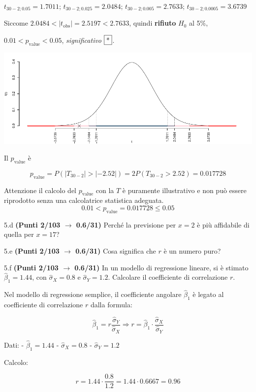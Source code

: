 \documentclass[
  11pt,
]{book}
\theoremstyle{mytheoremstyle}
\theoremstyle{mydefstyle}
\newenvironment{sol}
  {
  \begin{tcolorbox}[enhanced,breakable,arc=0.1mm,boxrule=1pt,colback=white,colframe=iblue,
  title=\bf \fontfamily{lmss}\selectfont \hspace{.5 cm} Soluzione,drop fuzzy shadow]

}{
\end{tcolorbox}
  }
\begin{document}
\begin{sol}
\(t_{30-2;0.05}=1.7011\); \(t_{30-2;0.025}=2.0484\); \(t_{30-2;0.005}=2.7633\); \(t_{30-2;0.0005}=3.6739\)

Siccome \(2.0484<|t_\text{obs}|=2.5197<2.7633\), quindi \textbf{rifiuto} \(H_0\) al 5\%,

\(0.01<p_\text{value}<0.05\), \emph{significativo} \(\fbox{*}\).

\begin{center}\includegraphics{Esami_passati_con_soluzioni_files/figure-latex/2.5c-1} \end{center}

Il \(p_{\text{value}}\) è

\[ p_{\text{value}} = P(|T_{30-2}|>|-2.52|)=2P(T_{30-2}>2.52)=0.017728 \]

Attenzione il calcolo del \(p_\text{value}\) con la \(T\) è puramente illustrativo e non può essere riprodotto senza una calcolatrice statistica adeguata.\[
 0.01 < p_\text{value}= 0.017728 \leq 0.05 
\]

\end{sol}

5.d \textbf{(Punti 2/103 \(\rightarrow\) 0.6/31)} Perché la previsione per \(x=2\) è più affidabile di quella per \(x=17\)?

5.e \textbf{(Punti 2/103 \(\rightarrow\) 0.6/31)} Cosa significa che \(r\) è un numero puro?

5.f \textbf{(Punti 2/103 \(\rightarrow\) 0.6/31)} In un modello di regressione lineare, si è stimato \(\hat\beta_1 = 1.44\), con \(\hat\sigma_X = 0.8\) e \(\hat\sigma_Y = 1.2\). Calcolare il coefficiente di correlazione \(r\).

\begin{sol}
Nel modello di regressione semplice, il coefficiente angolare \(\hat\beta_1\) è legato al coefficiente di correlazione \(r\) dalla formula:

\[
\hat\beta_1 = r \frac{\hat\sigma_Y}{\hat\sigma_X}
\Rightarrow
r = \hat\beta_1 \cdot \frac{\hat\sigma_X}{\hat\sigma_Y}
\]

Dati:
- \(\hat\beta_1 = 1.44\)
- \(\hat\sigma_X = 0.8\)
- \(\hat\sigma_Y = 1.2\)

Calcolo:

\[
r = 1.44 \cdot \frac{0.8}{1.2} = 1.44 \cdot 0.6667 = 0.96
\]

\end{sol}
\end{document}
